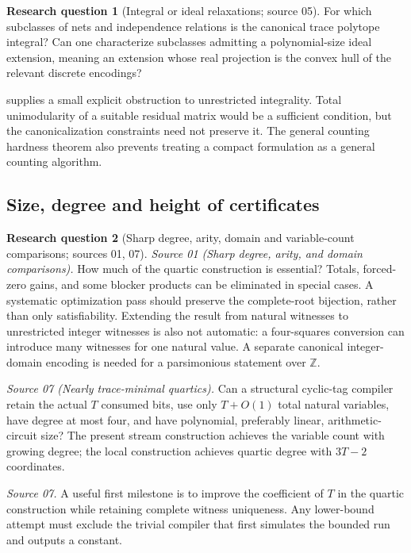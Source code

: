 \documentclass[11pt,a4paper]{article}
\theoremstyle{definition}
\newtheorem{question}[question]{Research question}
\theoremstyle{remark}
\newcommand{\Z}{\mathbb Z}
\begin{document}
\begin{question}[Integral or ideal relaxations; source 05]
For which subclasses of nets and independence relations is the canonical trace polytope integral? Can one characterize subclasses admitting a polynomial-size ideal extension, meaning an extension whose real projection is the convex hull of the relevant discrete encodings?
\end{question}
 supplies a small explicit obstruction to unrestricted integrality. Total unimodularity of a suitable residual matrix would be a sufficient condition, but the canonicalization constraints need not preserve it. The general counting hardness theorem also prevents treating a compact formulation as a general counting algorithm.

\subsection{Size, degree and height of certificates}

\begin{question}[Sharp degree, arity, domain and variable-count comparisons; sources 01, 07]\label{cdc:q:degree}
\emph{Source 01 (Sharp degree, arity, and domain comparisons).}
How much of the quartic construction is essential? Totals, forced-zero gains, and some blocker products can be eliminated in special cases. A systematic optimization pass should preserve the complete-root bijection, rather than only satisfiability. Extending the result from natural witnesses to unrestricted integer witnesses is also not automatic: a four-squares conversion can introduce many witnesses for one natural value. A separate canonical integer-domain encoding is needed for a parsimonious statement over $\Z$.

\emph{Source 07 (Nearly trace-minimal quartics).}
Can a structural cyclic-tag compiler retain the actual $T$ consumed bits, use only $T+O(1)$ total natural variables, have degree at most four, and have polynomial, preferably linear, arithmetic-circuit size? The present stream construction achieves the variable count with growing degree; the local construction achieves quartic degree with $3T-2$ coordinates.
\end{question}

\emph{Source 07.} A useful first milestone is to improve the coefficient of $T$ in the quartic construction while retaining complete witness uniqueness. Any lower-bound attempt must exclude the trivial compiler that first simulates the bounded run and outputs a constant.
\end{document}
